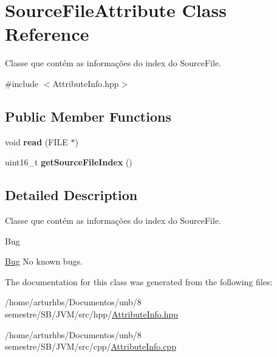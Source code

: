 \hypertarget{classSourceFileAttribute}{}\section{Source\+File\+Attribute Class Reference}
\label{classSourceFileAttribute}


Classe que contém as informações do index do Source\+File.  




{\ttfamily \#include $<$Attribute\+Info.\+hpp$>$}

\subsection*{Public Member Functions}
\begin{DoxyCompactItemize}
\item 
void {\bfseries read} (F\+I\+LE $\ast$)\hypertarget{classSourceFileAttribute_a011f9b30a98b40fefa1055dcdff01c12}{}\label{classSourceFileAttribute_a011f9b30a98b40fefa1055dcdff01c12}

\item 
uint16\+\_\+t {\bfseries get\+Source\+File\+Index} ()\hypertarget{classSourceFileAttribute_ab313b007ed8afe72c8f2ac0d6ff4cc0b}{}\label{classSourceFileAttribute_ab313b007ed8afe72c8f2ac0d6ff4cc0b}

\end{DoxyCompactItemize}


\subsection{Detailed Description}
Classe que contém as informações do index do Source\+File. 

\begin{DoxyRefDesc}{Bug}
\item[\hyperlink{bug__bug000008}{Bug}]No known bugs. \end{DoxyRefDesc}


The documentation for this class was generated from the following files\+:\begin{DoxyCompactItemize}
\item 
/home/arturhbs/\+Documentos/unb/8 semestre/\+S\+B/\+J\+V\+M/src/hpp/\hyperlink{AttributeInfo_8hpp}{Attribute\+Info.\+hpp}\item 
/home/arturhbs/\+Documentos/unb/8 semestre/\+S\+B/\+J\+V\+M/src/cpp/\hyperlink{AttributeInfo_8cpp}{Attribute\+Info.\+cpp}\end{DoxyCompactItemize}
